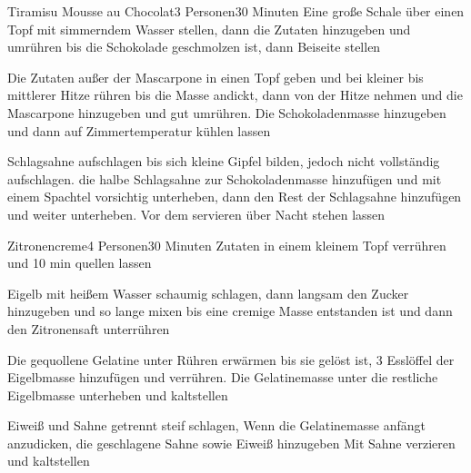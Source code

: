 
\begin{recipe}{Tiramisu Mousse au Chocolat}{3 Personen}{30 Minuten}
Eine große Schale über einen Topf mit simmerndem Wasser stellen, dann die Zutaten hinzugeben und umrühren bis die Schokolade geschmolzen ist, dann Beiseite stellen

Die Zutaten außer der Mascarpone in einen Topf geben und bei kleiner bis mittlerer Hitze rühren bis die Masse andickt, dann von der Hitze nehmen und die Mascarpone hinzugeben und gut umrühren.
Die Schokoladenmasse hinzugeben und dann auf Zimmertemperatur kühlen lassen

Schlagsahne aufschlagen bis sich kleine Gipfel bilden, jedoch nicht vollständig aufschlagen.
die halbe Schlagsahne zur Schokoladenmasse hinzufügen und mit einem Spachtel vorsichtig unterheben, dann den Rest der Schlagsahne hinzufügen und weiter unterheben.
Vor dem servieren über Nacht stehen lassen
\end{recipe}


\begin{recipe}{Zitronencreme}{4 Personen}{30 Minuten}
Zutaten in einem kleinem Topf verrühren und 10 min quellen lassen

Eigelb mit heißem Wasser schaumig schlagen, dann langsam den Zucker hinzugeben und so lange mixen bis eine cremige Masse entstanden ist und dann den Zitronensaft unterrühren

\ing[]{}{}
Die gequollene Gelatine unter Rühren erwärmen bis sie gelöst ist, 3 Esslöffel der Eigelbmasse hinzufügen und verrühren. Die Gelatinemasse unter die restliche Eigelbmasse unterheben und kaltstellen

Eiweiß und Sahne getrennt steif schlagen,
Wenn die Gelatinemasse anfängt anzudicken, die geschlagene Sahne sowie Eiweiß hinzugeben
Mit Sahne verzieren und kaltstellen
\end{recipe}

